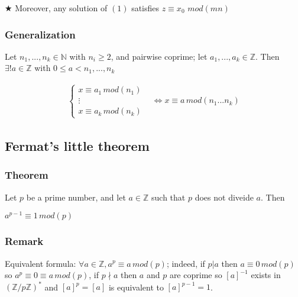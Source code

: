             \vspace{5pt}
            
            $\bigstar$ Moreover, any solution of $(1)$ satisfies $z \equiv x_0$ $mod(mn)$

            \newpage

            \subsubsection{Generalization}
                Let $n_1,...,n_k \in \mathbb{N}$ with $n_i\geq 2$, and pairwise coprime; let $a_1,...,a_k \in \mathbb{Z}$. Then $\exists ! a \in \mathbb{Z}$ with $0\leq a < n_1,...,n_k$

                    \begin{align*}
                        \begin{cases}
                            x \equiv a_1 \, mod(n_1) \\
                            \vdots \\
                            x \equiv a_k \, mod(n_k)
                        \end{cases}
                        & \Leftrightarrow x \equiv a \, mod(n_1...n_k)
                    \end{align*}

        \subsection{Fermat's little theorem}
            \subsubsection{Theorem}
                Let $p$ be a prime number, and let $a \in \mathbb{Z}$ such that $p$  does not diveide $a$. Then 

                \vspace{5pt}
                
                \centerline{$a^{p-1} \equiv 1 \, mod(p)$}

            \subsubsection{Remark}
                Equivalent formula: $\forall a \in \mathbb{Z}, a^p \equiv a \, mod(p)$; indeed, if $p|a$ then $a\equiv 0 \, mod(p)$ so $a^p \equiv 0 \equiv a \, mod(p)$, if $p\nmid a$ then $a$ and $p$ are coprime so $[a]^{-1}$ exists in $(\mathbb{Z}/p\mathbb{Z})^\ast$ and $[a]^p = [a]$ is equivalent to $[a]^{p-1} = 1$.

